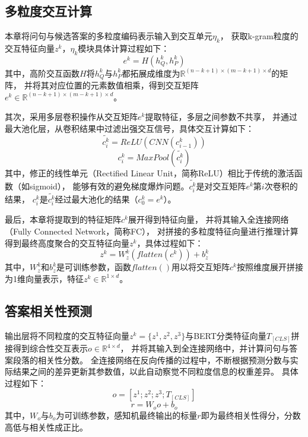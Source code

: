 \subsection{多粒度交互计算}

本章将问句与候选答案的多粒度编码表示输入到交互单元$\eta_k$，
获取k-gram粒度的交互特征向量$z^k$，$\eta_k$模块具体计算过程如下：
\begin{equation}
    e^k=H(h_Q^k,h_P^k)
\end{equation}
其中，高阶交互函数$H$将$h_Q^k$与$h_P^k$都拓展成维度为$\mathbb{R}^{(n-k+1)\times(m-k+1)\times d}$的矩阵，
并将其对应位置的元素数值相乘，得到交互矩阵$e^k\in\mathbb{R}^{(n-k+1)\times(m-k+1)\times d}$。

其次，采用多层卷积操作从交互矩阵$e^k$提取特征，多层之间参数不共享，
并通过最大池化层，从卷积结果中过滤出强交互信号，具体交互计算如下：
\begin{equation}
    \widetilde{c_i^k}=ReLU(CNN(c_{i-1}^k))
\end{equation}
\begin{equation}
    c_i^k=MaxPool(\widetilde{c_i^k})
\end{equation}
其中，修正的线性单元（Rectified Linear Unit，简称ReLU）\cite{nair2010rectified}相比于传统的激活函数（如sigmoid\cite{han1995influence}），
能够有效的避免梯度爆炸问题。$\widetilde{c_i^k}$是对交互矩阵$e^k$第$i$次卷积的结果，
$c_i^k$是$\widetilde{c_i^k}$经过最大池化的结果（$c_0^k=e^k$）。

最后，本章将提取到的特征矩阵$c^k$展开得到特征向量，
并将其输入全连接网络（Fully Connected Network，简称FC），
对拼接的多粒度特征向量进行推理计算得到最终高度聚合的交互特征向量$z^k$，具体过程如下：
\begin{equation}
    z^k=W_z^k(flatten(c^k))+b_z^k
\end{equation}
其中，$W_z^k$和$b_z^k$是可训练参数，函数$flatten()$用以将交互矩阵$c^k$按照维度展开拼接为1维向量表示，特征$z^k\in\mathbb{R}^{1\times d}$。

\subsection{答案相关性预测}

输出层将不同粒度的交互特征向量$z^k=\{z^1,z^2,z^3\}$与BERT分类特征向量$T_{[CLS]}$拼接得到综合性交互表示$o\in\mathbb{R}^{4\times d}$，
并将其输入到全连接网络中，并计算问句与答案段落的相关性分数。
全连接网络在反向传播的过程中，不断根据预测分数与实际结果之间的差异更新其参数值，以此自动察觉不同粒度信息的权重差异。
具体过程如下：
\begin{equation}
    o=[z^1;z^2;z^3;T_{[CLS]}]
\end{equation}
\begin{equation}
    r=W_oo+b_o
\end{equation}
其中，$W_o$与$b_o$为可训练参数，感知机最终输出的标量$r$即为最终相关性得分，分数高低与相关性成正比。

